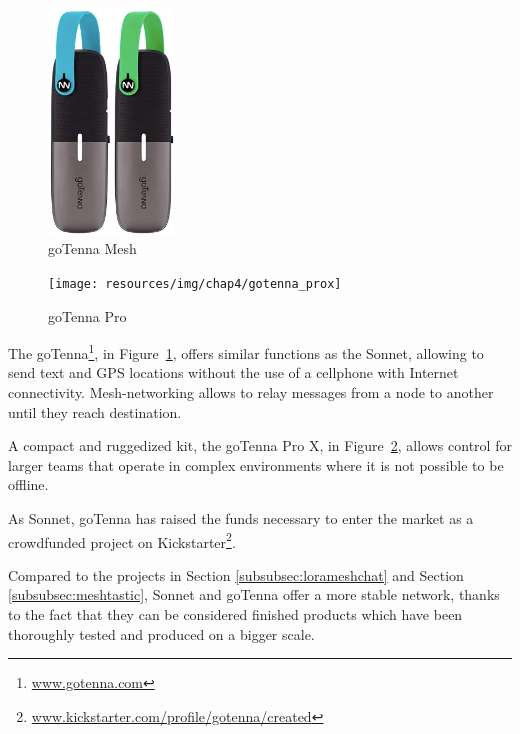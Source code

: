 				\begin{minipage}{0.5\textwidth}%
					\begin{figure}[H]
						\centering
						\includegraphics[height=6cm]{resources/img/chap4/gotenna}
						\caption{goTenna Mesh}
						\label{img:gotenna}
					\end{figure}
				\end{minipage}%
				\hfill%
				\begin{minipage}{0.5\textwidth}\raggedright
					\begin{figure}[H]
						\centering
						\texttt{[image: resources/img/chap4/gotenna\_prox]}
						\caption{goTenna Pro}
						\label{img:gotenna_pro}
					\end{figure}
				\end{minipage}%
				\newpage
				
				The goTenna\footnote{ \url{www.gotenna.com}}, in Figure~\ref{img:gotenna}, offers similar functions as the Sonnet, allowing to send text and GPS locations without the use of a cellphone with Internet connectivity.
				Mesh-networking allows to relay messages from a node to another until they reach destination.
				
				A compact and ruggedized kit, the goTenna Pro X, in Figure~\ref{img:gotenna_pro}, allows control for larger teams that operate in complex environments where it is not possible to be offline.
						
				As Sonnet, goTenna has raised the funds necessary to enter the market as a crowdfunded project on Kickstarter\footnote{ \url{www.kickstarter.com/profile/gotenna/created}}.
				
				Compared to the projects in Section \ref{subsubsec:lorameshchat} and Section \ref{subsubsec:meshtastic}, Sonnet and goTenna offer a more stable network, thanks to the fact that they can be considered finished products which have been thoroughly tested and produced on a bigger scale.
						

